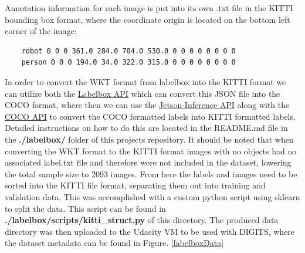 \documentclass[10pt,journal,compsoc]{IEEEtran}
\begin{document}
Annotation information for each image is put into its own .txt file in the KITTI bounding box format, where the coordinate origin is located on the bottom left corner of the image:

\begin{lstlisting}
    robot 0 0 0 361.0 284.0 704.0 530.0 0 0 0 0 0 0 0 0
    person 0 0 0 194.0 34.0 322.0 315.0 0 0 0 0 0 0 0 0
\end{lstlisting}

In order to convert the WKT format from labelbox into the KITTI format we can utilize both the \href{https://github.com/Labelbox/Labelbox/tree/master/scripts}{Labelbox API} which can convert this JSON file into the COCO format, where then we can use the \href{https://github.com/dusty-nv/jetson-inference/blob/master/tools}{Jetson-Inference API}
along with the \href{https://github.com/cocodataset/cocoapi}{COCO API} to convert the COCO formatted labels into KITTI formatted labels. Detailed instructions on how to do this are located in the README.md file in the \textbf{./labelbox/} folder of this projects repository. It should be noted that when converting the WKT format to the KITTI format images with no objects had no associated label.txt file and therefore were not included in the dataset, lowering the total sample size to 2093 images.  From here the labels and images need to be sorted into the KITTI file format, separating them out into training and validation data. This was accomplished with a custom python script using sklearn to split the data. This script can be found in \textbf{./labelbox/scripts/kitti\_struct.py} of this directory. The produced data directory was then uploaded to the Udacity VM to be used with DIGITS, where the dataset metadata can be found in Figure. \ref{labelboxData}
\end{document}
